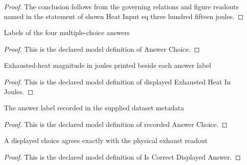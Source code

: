 \begin{proof}
  The conclusion follows from the governing relations and figure readouts named in the statement of shown Heat Input eq three hundred fifteen joules.
\end{proof}
\begin{definition}
  \label{def:physics:phyx-mini-0421:phyxminiproblems-problemphyxmini0421-answerchoice}
  Labels of the four multiple-choice answers
\end{definition}
\begin{proof}
  This is the declared model definition of Answer Choice.
\end{proof}
\begin{definition}
  \label{def:physics:phyx-mini-0421:phyxminiproblems-problemphyxmini0421-displayedexhaustedheatinjoules}
  Exhausted-heat magnitude in joules printed beside each answer label
\end{definition}
\begin{proof}
  This is the declared model definition of displayed Exhausted Heat In Joules.
\end{proof}
\begin{definition}
  \label{def:physics:phyx-mini-0421:phyxminiproblems-problemphyxmini0421-recordedanswerchoice}
  The answer label recorded in the supplied dataset metadata
\end{definition}
\begin{proof}
  This is the declared model definition of recorded Answer Choice.
\end{proof}
\begin{definition}
  \label{def:physics:phyx-mini-0421:phyxminiproblems-problemphyxmini0421-iscorrectdisplayedanswer}
  A displayed choice agrees exactly with the physical exhaust readout
\end{definition}
\begin{proof}
  This is the declared model definition of Is Correct Displayed Answer.
\end{proof}
